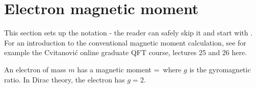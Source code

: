 \section{Electron magnetic moment}
\label{sect:magMom}

\noindent
This section sets up the notation - the reader can safely skip it and
start with . For an introduction to the
conventional magnetic moment calculation, see for example the
Cvitanovi\'c online graduate QFT course, lectures 25 and 26
{here}.

An electron of mass $m$  has a magnetic moment
\beq
\mu=\,
where $g$ is the gyromagnetic ratio.
In Dirac theory, the electron has $g=2$.

